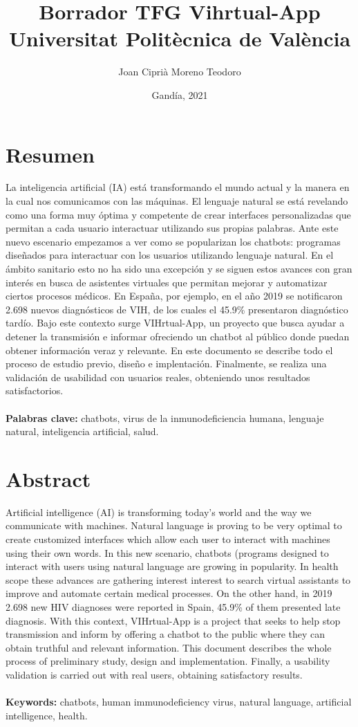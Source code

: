 \documentclass[11pt,a4paper]{book}
\title{
{Borrador TFG Vihrtual-App}\\
{\large Universitat Politècnica de València}\\
}
\author{Joan Ciprià Moreno Teodoro}
\date{Gandía, 2021}
\begin{document}
\maketitle

\chapter*{Resumen}
La inteligencia artificial (IA) está transformando el mundo actual y la manera en la cual nos comunicamos con las máquinas. El lenguaje natural se está revelando como una forma muy óptima y competente de crear interfaces personalizadas que permitan a cada usuario interactuar utilizando sus propias palabras. Ante este nuevo escenario empezamos a ver como se popularizan los chatbots: programas diseñados para interactuar con los usuarios utilizando lenguaje natural. En el ámbito sanitario esto no ha sido una excepción y se siguen estos avances con gran interés en busca de asistentes virtuales que permitan mejorar y automatizar ciertos procesos médicos. En España, por ejemplo, en el año 2019 se notificaron 2.698 nuevos diagnósticos de VIH, de los cuales el 45.9\% presentaron diagnóstico tardío. Bajo este contexto surge VIHrtual-App, un proyecto que busca ayudar a detener la transmisión e informar ofreciendo un chatbot al público donde puedan obtener información veraz y relevante. En este documento se describe todo el proceso de estudio previo, diseño e implentación. Finalmente, se realiza una validación de usabilidad con usuarios reales, obteniendo unos resultados satisfactorios.\\
\\
\textbf{Palabras clave:} chatbots, virus de la inmunodeficiencia humana, lenguaje natural, inteligencia artificial, salud.

\chapter*{Abstract}
Artificial intelligence (AI) is transforming today's world and the way we communicate with machines. Natural language is proving to be very optimal to create customized interfaces which allow each user to interact with machines using their own words. In this new scenario, chatbots (programs designed to interact with users using natural language are growing in popularity. In health scope these advances are gathering interest interest to search virtual assistants to improve and automate certain medical processes. On the other hand, in 2019 2.698 new HIV diagnoses were reported in Spain, 45.9\% of them presented late diagnosis. With this context, VIHrtual-App is a project that seeks to help stop transmission and inform by offering a chatbot to the public where they can obtain truthful and relevant information. This document describes the whole process of preliminary study, design and implementation. Finally, a usability validation is carried out with real users, obtaining satisfactory results.\\
\\
\textbf{Keywords:} chatbots, human immunodeficiency virus, natural language, artificial intelligence, health. 
\end{document}
